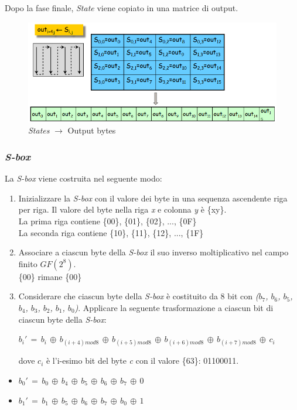 \documentclass[a4paper,11pt]{article}
\begin{document}
Dopo la fase finale, \textit{State} viene copiato in una matrice di output.
\begin{figure}[H]
    \centering
    \includegraphics[scale=0.5]{stateOUT}
    \caption{\textit{States} $\rightarrow$ Output bytes}    
\end{figure}

\subsubsection{\textit{S-box}}
La \textit{S-box} viene costruita nel seguente modo:
\begin{enumerate}
    \item Inizializzare la \textit{S-box} con il valore dei byte in una sequenza ascendente riga per riga. Il valore del byte nella riga \textit{x} e colonna \textit{y} è \{xy\}.\\
    La prima riga contiene \{00\}, \{01\}, \{02\}, ..., \{0F\}\\
    La seconda riga contiene \{10\}, \{11\}, \{12\}, ..., \{1F\}
    \item Associare a ciascun byte della \textit{S-box} il suo inverso moltiplicativo nel campo finito $GF(2^8)$. \\
    \{00\} rimane \{00\}
    \item Considerare che ciascun byte della \textit{S-box} è costituito da 8 bit con \textit{($b_7$, $b_6$, $b_5$, $b_4$, $b_3$, $b_2$, $b_1$, $b_0$)}. Applicare la seguente trasformazione a ciascun bit di ciascun byte della \textit{S-box}:
    \begin{center}
        $b_i'\, = \, b_i \, \oplus \, b_{(i+4)mod8} \, \oplus \, b_{(i+5)mod8} \, \oplus \, b_{(i+6)mod8} \, \oplus \, b_{(i+7)mod8} \, \oplus \, c_i$
    \end{center}
    dove $c_i$ è l'i-esimo bit del byte \textit{c} con il valore \{63\}: 01100011.
\end{enumerate}
\begin{itemize}
    \item[] $b_0'\, = \, b_0 \, \oplus \, b_4 \, \oplus \, b_5 \, \oplus \, b_6 \, \oplus \, b_7 \, \oplus \, 0$
    \item[] $b_1'\, = \, b_1 \, \oplus \, b_5 \, \oplus \, b_6 \, \oplus \, b_7 \, \oplus \, b_0 \, \oplus \, 1$
\end{itemize}
\end{document}
